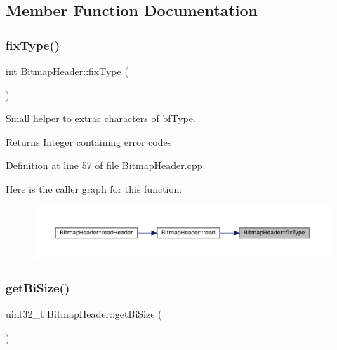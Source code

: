 \subsection{Member Function Documentation}
\mbox{\label{classBitmapHeader_aa02e59db95074c6a96a44dac03cee77b}} 
\subsubsection{\texorpdfstring{fixType()}{fixType()}}
{\footnotesize\ttfamily int Bitmap\+Header\+::fix\+Type (\begin{DoxyParamCaption}{ }\end{DoxyParamCaption})\hspace{0.3cm}{\ttfamily [private]}}



Small helper to extrac characters of bf\+Type. 

\begin{DoxyReturn}{Returns}
Integer containing error codes 
\end{DoxyReturn}


Definition at line 57 of file Bitmap\+Header.\+cpp.

Here is the caller graph for this function\+:
\nopagebreak
\begin{figure}[H]
\begin{center}
\leavevmode
\includegraphics[width=350pt]{classBitmapHeader_aa02e59db95074c6a96a44dac03cee77b_icgraph}
\end{center}
\end{figure}
\mbox{\label{classBitmapHeader_acce4b6292e2aaf5dbd4bc10687c4fb65}} 
\subsubsection{\texorpdfstring{getBiSize()}{getBiSize()}}
{\footnotesize\ttfamily uint32\+\_\+t Bitmap\+Header\+::get\+Bi\+Size (\begin{DoxyParamCaption}{ }\end{DoxyParamCaption})}



